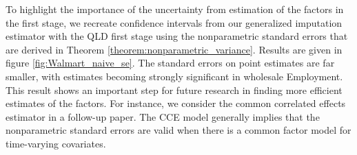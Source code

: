 \documentclass[12pt]{article}
\begin{document}
% 
% 
% 

To highlight the importance of the uncertainty from estimation of the factors in the first stage, we recreate confidence intervals from our generalized imputation estimator with the QLD first stage using the nonparametric standard errors that are derived in Theorem \ref{theorem:nonparametric_variance}. Results are given in figure \ref{fig:Walmart_naive_se}. The standard errors on point estimates are far smaller, with estimates becoming strongly significant in wholesale Employment. This result shows an important step for future research in finding more efficient estimates of the factors. For instance, we consider the common correlated effects estimator in a follow-up paper. The CCE model generally implies that the nonparametric standard errors are valid when there is a common factor model for time-varying covariates.
\end{document}
